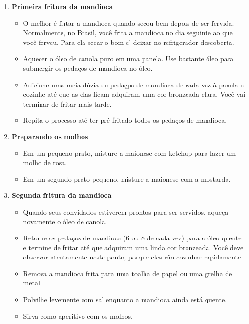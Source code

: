 \documentclass [11pt, letterpaper] {article}
\begin{document}
\begin {description}
\begin {enumerate}
\begin {itemize}
\item Cubra a panela de press\~ao e cozinhe, sob pressão, por 15 minutos. 
\item Coloque a panela de pressão sob água fria e remova cuidadosamente a válvula de pressão para liberar o vapor.
\item Desligue o fogo, adicione sal à água e deixe reposar por 5 a 10 minutos.
\item Escorre a mandioca cozida em uma coador de massa.
\item Muitas vezes, a mandioca cozida é servidos como um acompanhamento para pratos de carne.
\end {itemize}


\item {\bf Primeira fritura da mandioca}
\begin {itemize}
\item O melhor é fritar a mandioca quando secou bem depois de ser fervida. Normalmente, no Brasil, você frita a mandioca no dia seguinte ao que você ferveu. Para ela secar o bom e' deixar no refrigerador descoberta.
\item Aquecer o óleo de canola puro em uma panela. Use bastante óleo para submergir os pedaços de mandioca no óleo.
\item Adicione uma meia dúzia de peda\c{c}ps de mandioca de cada vez \`a panela e cozinhe até que as elas ficam adquiram uma cor bronzeada clara. Você vai terminar de fritar mais tarde.
\item Repita o processo até ter pré-fritado todos os pedaços de mandioca.
\end {itemize}
\item {\bf Preparando os molhos}
\begin {itemize}
\item Em um pequeno prato, misture a maionese com ketchup para fazer um molho de rosa.
\item Em um segundo prato pequeno, misture a maionese com a mostarda.
\end {itemize}
\item {\bf Segunda fritura da mandioca}
\begin {itemize}
\item Quando seus convidados estiverem prontos para ser servidos, aque\c{c}a novamente o óleo de canola.
\item Retorne os pedaços de mandioca (6 ou 8 de cada vez) para o óleo quente e termine de fritar até que adquiram uma linda cor bronzeada. Você deve observar atentamente neste ponto, porque eles vão cozinhar rapidamente.
\item Remova a mandioca frita para uma toalha de papel ou uma grelha de metal. 
\item Polvilhe levemente com sal enquanto a mandioca ainda est\'a quente.
\item Sirva como aperitivo com os molhos.
\end {itemize}
\end {enumerate}
\end {description}
\end{document}
